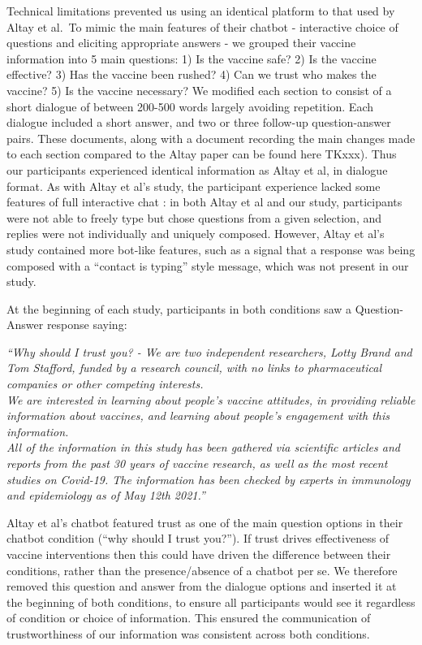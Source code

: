 \documentclass[
  english,
  ,jou,floatsintext]{apa6}
\begin{document}
Technical limitations prevented us using an identical platform to that used by Altay et al.~To mimic the main features of their chatbot - interactive choice of questions and eliciting appropriate answers - we grouped their vaccine information into 5 main questions: 1) Is the vaccine safe? 2) Is the vaccine effective? 3) Has the vaccine been rushed? 4) Can we trust who makes the vaccine? 5) Is the vaccine necessary? We modified each section to consist of a short dialogue of between 200-500 words largely avoiding repetition. Each dialogue included a short answer, and two or three follow-up question-answer pairs. These documents, along with a document recording the main changes made to each section compared to the Altay paper can be found here TKxxx). Thus our participants experienced identical information as Altay et al, in dialogue format. As with Altay et al's study, the participant experience lacked some features of full interactive chat : in both Altay et al and our study, participants were not able to freely type but chose questions from a given selection, and replies were not individually and uniquely composed. However, Altay et al's study contained more bot-like features, such as a signal that a response was being composed with a ``contact is typing'' style message, which was not present in our study.

At the beginning of each study, participants in both conditions saw a Question-Answer response saying:

\emph{``Why should I trust you? - We are two independent researchers, Lotty Brand and Tom Stafford, funded by a research council, with no links to pharmaceutical companies or other competing interests. }\\
\emph{We are interested in learning about people's vaccine attitudes, in providing reliable information about vaccines, and learning about people's engagement with this information. }\\
\emph{All of the information in this study has been gathered via scientific articles and reports from the past 30 years of vaccine research, as well as the most recent studies on Covid-19. The information has been checked by experts in immunology and epidemiology as of May 12th 2021.''}

Altay et al's chatbot featured trust as one of the main question options in their chatbot condition (``why should I trust you?''). If trust drives effectiveness of vaccine interventions then this could have driven the difference between their conditions, rather than the presence/absence of a chatbot per se. We therefore removed this question and answer from the dialogue options and inserted it at the beginning of both conditions, to ensure all participants would see it regardless of condition or choice of information. This ensured the communication of trustworthiness of our information was consistent across both conditions.
\end{document}
